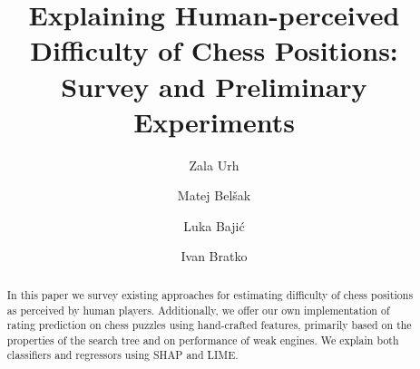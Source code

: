 \documentclass[sigconf,nonacm]{acmart}
\begin{document}
\title{Explaining Human-perceived Difficulty of Chess Positions: Survey and Preliminary Experiments}


\author{Zala Urh}

\author{Matej Belšak}

\author{Luka Bajić}

\author{Ivan Bratko}

\begin{abstract}
In this paper we survey existing approaches for estimating difficulty of chess positions as perceived by human players. Additionally, we offer our own implementation of rating prediction on chess puzzles using hand-crafted features, primarily based on the properties of the search tree and on performance of weak engines. We explain both classifiers and regressors using SHAP and LIME.  
\end{abstract}
\end{document}
